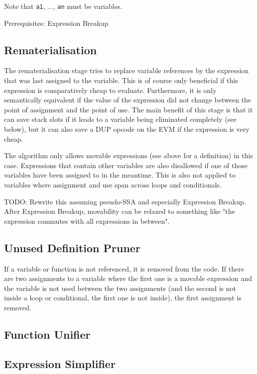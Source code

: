 \documentclass[11pt,letterpaper]{article}
\begin{document}
Note that \verb|a1|, ..., \verb|an| must be variables.

Prerequisites: Expression Breakup

\subsection{Rematerialisation}

The rematerialisation stage tries to replace variable references by the expression that
was last assigned to the variable. This is of course only beneficial if this expression
is comparatively cheap to evaluate. Furthermore, it is only semantically equivalent if
the value of the expression did not change between the point of assignment and the
point of use. The main benefit of this stage is that it can save stack slots if it
leads to a variable being eliminated completely (see below), but it can also
save a DUP opcode on the EVM if the expression is very cheap.

The algorithm only allows movable expressions (see above for a definition) in this case.
Expressions that contain other variables are also disallowed if one of those variables
have been assigned to in the meantime. This is also not applied to variables where
assignment and use span across loops and conditionals.

TODO: Rewrite this assuming pseudo-SSA and especially Expression Breakup.
After Expression Breakup, movability can be relaxed to something like
"the expression commutes with all expressions in between".

\subsection{Unused Definition Pruner}

If a variable or function is not referenced, it is removed from the code.
If there are two assignments to a variable where the first one is a movable expression
and the variable is not used between the two assignments (and the second is not inside
a loop or conditional, the first one is not inside), the first assignment is removed.


\subsection{Function Unifier}

\subsection{Expression Simplifier}
\end{document}
